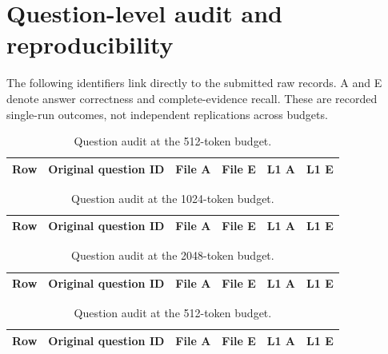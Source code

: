\clearpage\appendix

\section{Question-level audit and reproducibility}

The following identifiers link directly to the submitted raw records. A and E denote answer correctness and complete-evidence recall. These are recorded single-run outcomes, not independent replications across budgets.

\begin{table}[htbp]\centering\scriptsize

\caption{Question audit at the 512-token budget.}

\begin{tabular}{llrrrr}\toprule Row & Original question ID & File A & File E & L1 A & L1 E \\\midrule

\bottomrule\end{tabular}\end{table}

\begin{table}[htbp]\centering\scriptsize

\caption{Question audit at the 1024-token budget.}

\begin{tabular}{llrrrr}\toprule Row & Original question ID & File A & File E & L1 A & L1 E \\\midrule

\bottomrule\end{tabular}\end{table}

\begin{table}[htbp]\centering\scriptsize

\caption{Question audit at the 2048-token budget.}

\begin{tabular}{llrrrr}\toprule Row & Original question ID & File A & File E & L1 A & L1 E \\\midrule

\bottomrule\end{tabular}\end{table}

\begin{table}[htbp]\centering\scriptsize

\caption{Question audit at the 512-token budget.}

\begin{tabular}{llrrrr}\toprule Row & Original question ID & File A & File E & L1 A & L1 E \\\midrule

\bottomrule\end{tabular}\end{table}

